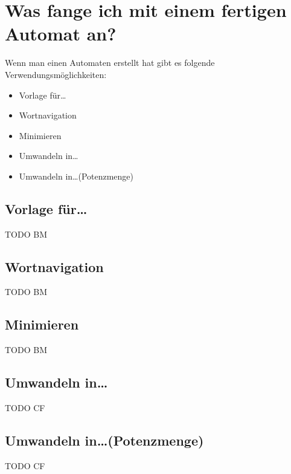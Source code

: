 \section{Was fange ich mit einem fertigen Automat an?}

Wenn man einen Automaten erstellt hat gibt es folgende
Ver\-wen\-dungs\-möglich\-keiten:

\begin{itemize}
  \item Vorlage für\ldots
  \item Wortnavigation
  \item Minimieren
  \item Umwandeln in\ldots
  \item Umwandeln in\ldots (Potenzmenge)
\end{itemize}

\subsection{Vorlage für\ldots}
  
  TODO BM
  
\subsection{Wortnavigation}
  
  TODO BM
  
\subsection{Minimieren}
  
  TODO BM
  
\subsection{Umwandeln in\ldots}
  
  TODO CF
  
\subsection{Umwandeln in\ldots (Potenzmenge)}
  
  TODO CF
  
  
